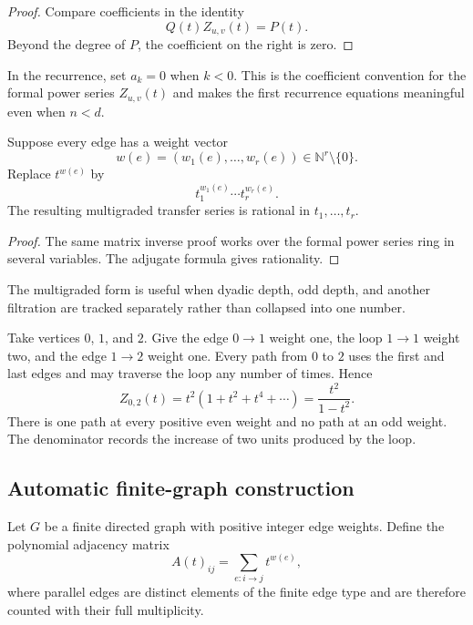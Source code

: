 \begin{proof}
Compare coefficients in the identity
\[
Q(t)Z_{u,v}(t)=P(t).
\]
Beyond the degree of $P$, the coefficient on the right is zero.
\end{proof}

In the recurrence, set $a_k=0$ when $k<0$. This is the coefficient convention for the formal power series $Z_{u,v}(t)$ and makes the first recurrence equations meaningful even when $n<d$.

\begin{corollary}\label{cor:multigraded_series}
Suppose every edge has a weight vector
\[
w(e)=(w_1(e),\ldots,w_r(e))\in\mathbb N^r\setminus\{0\}.
\]
Replace $t^{w(e)}$ by
\[
t_1^{w_1(e)}\cdots t_r^{w_r(e)}.
\]
The resulting multigraded transfer series is rational in $t_1,\ldots,t_r$.
\end{corollary}

\begin{proof}
The same matrix inverse proof works over the formal power series ring in several variables.  The adjugate formula gives rationality.
\end{proof}

The multigraded form is useful when dyadic depth, odd depth, and another filtration are tracked separately rather than collapsed into one number.

\begin{example}\label{ex:simple_transfer_series}
Take vertices $0$, $1$, and $2$.  Give the edge $0\to1$ weight one, the loop $1\to1$ weight two, and the edge $1\to2$ weight one.  Every path from $0$ to $2$ uses the first and last edges and may traverse the loop any number of times.  Hence
\[
Z_{0,2}(t)
=
t^2(1+t^2+t^4+\cdots)
=
\frac{t^2}{1-t^2}.
\]
There is one path at every positive even weight and no path at an odd weight.  The denominator records the increase of two units produced by the loop.
\end{example}

\subsection{Automatic finite-graph construction}

Let $G$ be a finite directed graph with positive integer edge weights. Define the polynomial adjacency matrix
\[
A(t)_{ij}
=
\sum_{e:i\to j}t^{w(e)},
\]
where parallel edges are distinct elements of the finite edge type and are
therefore counted with their full multiplicity.

